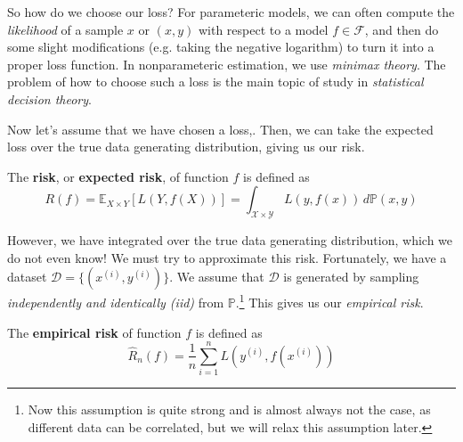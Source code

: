 So how do we choose our loss? For parameteric models, we can often compute the \textit{likelihood} of a sample $x$ or $(x, y)$ with respect to a model $f \in \mathcal{F}$, and then do some slight modifications (e.g. taking the negative logarithm) to turn it into a proper loss function. In nonparameteric estimation, we use \textit{minimax theory}. The problem of how to choose such a loss is the main topic of study in \textit{statistical decision theory}. 

Now let's assume that we have chosen a loss,. Then, we can take the expected loss over the true data generating distribution, giving us our risk. 

\begin{definition}[Risk]
  The \textbf{risk}, or \textbf{expected risk}, of function $f$ is defined as 
  \begin{equation}
    R(f) = \mathbb{E}_{X \times Y} [ L(Y, f(X))] = \int_{\mathcal{X} \times \mathcal{Y}} L(y, f(x)) \,d\mathbb{P}(x, y)
  \end{equation}
\end{definition}

However, we have integrated over the true data generating distribution, which we do not even know! We must try to approximate this risk. Fortunately, we have a dataset $\mathcal{D} = \{(x^{(i)}, y^{(i)})\}$. We assume that $\mathcal{D}$ is generated by sampling \textit{independently and identically (iid)} from $\mathbb{P}$.\footnote{Now this assumption is quite strong and is almost always not the case, as different data can be correlated, but we will relax this assumption later.} This gives us our \textit{empirical risk}. 

\begin{definition}
  The \textbf{empirical risk} of function $f$ is defined as 
  \begin{equation}
    \hat{R}_n(f) = \frac{1}{n} \sum_{i=1}^n L(y^{(i)}, f(x^{(i)}))
  \end{equation}
\end{definition}

